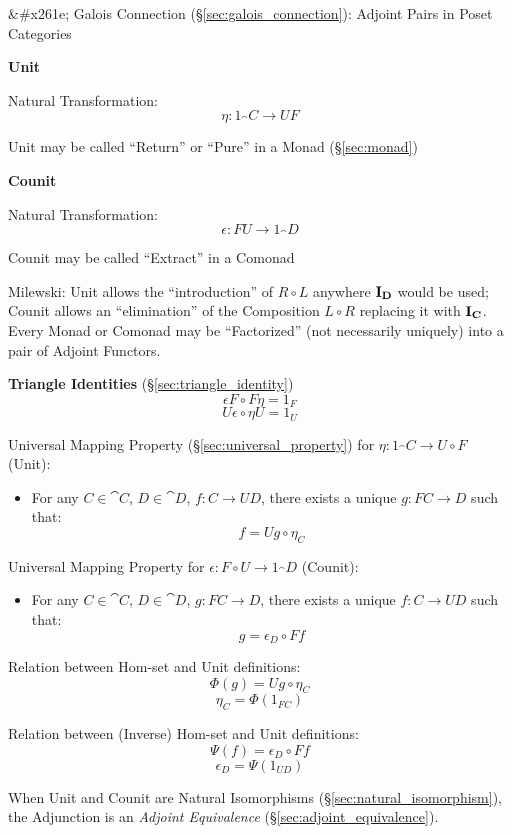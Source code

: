&#x261e; Galois Connection (\S\ref{sec:galois_connection}): Adjoint
Pairs in Poset Categories


\textbf{Unit}

Natural Transformation:
\[
  \eta : 1_\cat{C} \rightarrow U F
\]

\fist Unit may be called ``Return'' or ``Pure'' in a Monad
(\S\ref{sec:monad})


\textbf{Counit}

Natural Transformation:
\[
  \epsilon : F U \rightarrow 1_\cat{D}
\]

\fist Counit may be called ``Extract'' in a Comonad


Milewski: Unit allows the ``introduction'' of $R \circ L$ anywhere
$\mathbf{I}_\mathbf{D}$ would be used; Counit allows an ``elimination'' of the
Composition $L \circ R$ replacing it with $\mathbf{I}_\mathbf{C}$. Every Monad
or Comonad may be ``Factorized'' (not necessarily uniquely) into a
pair of Adjoint Functors.


\textbf{Triangle Identities} (\S\ref{sec:triangle_identity})
\[
  \epsilon F \circ F \eta = 1_F
\]\[
  U \epsilon \circ \eta U = 1_U
\]


Universal Mapping Property (\S\ref{sec:universal_property}) for $\eta
: 1_\cat{C} \rightarrow U \circ F$ (Unit):
\begin{itemize}
\item For any $C \in \cat{C}$, $D \in \cat{D}$, $f : C
  \rightarrow U D$, there exists a unique $g : FC \rightarrow D$ such
  that:
  \[
    f = U g \circ \eta_C
  \]
\end{itemize}

Universal Mapping Property for $\epsilon : F \circ U \rightarrow
1_\cat{D}$ (Counit):
\begin{itemize}
\item For any $C \in \cat{C}$, $D \in \cat{D}$, $g : F C
  \rightarrow D$, there exists a unique $f : C \rightarrow U D$ such
  that:
  \[
    g = \epsilon_D \circ F f
  \]
\end{itemize}

Relation between Hom-set and Unit definitions:
\[
  \Phi(g) = U g \circ \eta_C
\]\[
  \eta_C = \Phi(1_{FC})
\]

Relation between (Inverse) Hom-set and Unit definitions:
\[
  \Psi (f) = \epsilon_D \circ F f
\]\[
  \epsilon_D = \Psi(1_{U D})
\]

When Unit and Counit are Natural Isomorphisms
(\S\ref{sec:natural_isomorphism}), the Adjunction is an \emph{Adjoint
  Equivalence} (\S\ref{sec:adjoint_equivalence}).

